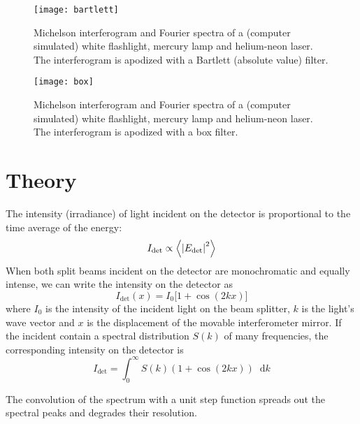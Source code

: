 \documentclass[11pt, a4paper]{article}
\newcommand{\diff}{\mathop{}\!\mathrm{d}} %
\begin{document}
\begin{figure}
\centering
\texttt{[image: bartlett]}
\caption{Michelson interferogram and Fourier spectra of a (computer simulated) white flashlight, mercury lamp and helium-neon laser. The interferogram is apodized with a Bartlett (absolute value) filter.}
\end{figure}


\begin{figure}
\centering
\texttt{[image: box]}
\caption{Michelson interferogram and Fourier spectra of a (computer simulated) white flashlight, mercury lamp and helium-neon laser. The interferogram is apodized with a box filter.}
\end{figure}


\appendix

\section{Theory}

The intensity (irradiance) of light incident on the detector is proportional to the time average of the energy:
\begin{equation*}
	I_{\text{det}} \propto \ev{\abs{E_{\text{det}}}^{2}}
\end{equation*}
When both split beams incident on the detector are monochromatic and equally intense, we can write the intensity on the detector as
\begin{equation*}
	I_{\text{det}}(x) = I_{0}\big[1 + \cos(2k x)\big]
\end{equation*}
where $ I_{0} $ is the intensity of the incident light on the beam splitter, $ k $ is the light's wave vector and $ x $ is the displacement of the movable interferometer mirror. If the incident contain a spectral distribution $ S(k) $ of many frequencies, the corresponding intensity on the detector is
\begin{equation*}
	I_{\text{det}} = \int_{0}^{\infty}S(k)(1 + \cos(2kx)) \diff k
\end{equation*}

The convolution of the spectrum with a unit step function spreads out the spectral peaks and degrades their resolution.
\end{document}
